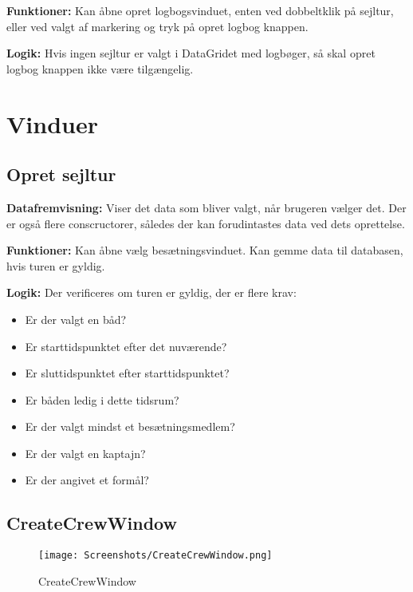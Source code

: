 \textbf{Funktioner:} 
Kan åbne opret logbogsvinduet, enten ved dobbeltklik på sejltur, eller ved valgt af markering og tryk på opret logbog knappen. 

\textbf{Logik:} 
Hvis ingen sejltur er valgt i DataGridet med logbøger, så skal opret logbog knappen ikke være tilgængelig.



\section{Vinduer}
\subsection{Opret sejltur}

\textbf{Datafremvisning:} 
Viser det data som bliver valgt, når brugeren vælger det. 
Der er også flere conscructorer, således der kan forudintastes data ved dets oprettelse.

\textbf{Funktioner:} 
Kan åbne vælg besætningsvinduet. 
Kan gemme data til databasen, hvis turen er gyldig.

\textbf{Logik:} 
Der verificeres om turen er gyldig, der er flere krav:
\begin{itemize}
    \item Er der valgt en båd?
    \item Er starttidspunktet efter det nuværende?
    \item Er sluttidspunktet efter starttidspunktet?
    \item Er båden ledig i dette tidsrum?
    \item Er der valgt mindst et besætningsmedlem?
    \item Er der valgt en kaptajn?
    \item Er der angivet et formål?
\end{itemize}

\subsection{CreateCrewWindow}

\begin{wrapfigure}{r}{0.5\textwidth}
    \label{img:login_interface}
    \vspace{-20pt}
    \begin{center}
        \texttt{[image: Screenshots/CreateCrewWindow.png]}
    \end{center}
    \vspace{-15pt}
    \caption{CreateCrewWindow}
\end{wrapfigure}

